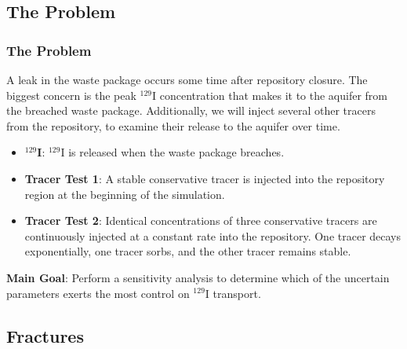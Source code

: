 \documentclass{beamer}
\begin{document}
\subsection{The Problem}

\begin{frame}[fragile]\frametitle{The Problem}
	A leak in the waste package occurs some time after repository closure. The biggest concern is the peak $^{129}$I concentration that makes it to the aquifer from the breached waste package. Additionally, we will inject several other tracers from the repository, to examine their release to the aquifer over time.
	\begin{itemize}
		\item \textbf{$^{129}$I}: $^{129}$I is released when the waste package breaches.
		\item \textbf{Tracer Test 1}: A stable conservative tracer is injected into the repository region at the beginning of the simulation.
		\item \textbf{Tracer Test 2}: Identical concentrations of three conservative tracers are continuously injected at a constant rate into the repository. One tracer decays exponentially, one tracer sorbs, and the other tracer remains stable.
	\end{itemize}
	\textbf{Main Goal}: Perform a sensitivity analysis to determine which of the uncertain parameters exerts the most control on $^{129}$I transport.
\end{frame}

\subsection{Fractures}
\end{document}
